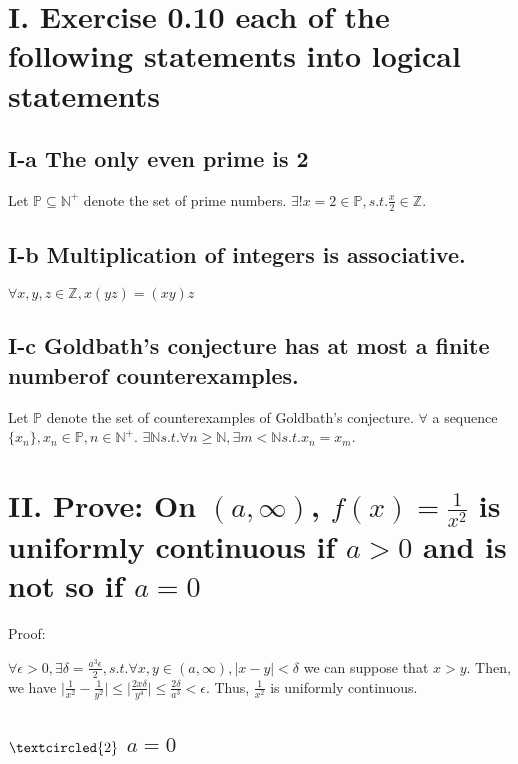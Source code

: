 \documentclass[twoside,a4paper]{article}
\begin{document}
\pagestyle{fancy}
\fancyhead{}


\section*{I. Exercise 0.10 \small{each of the following statements into logical statements}}

\subsection*{I-a \small{The only even prime is 2}}

Let $\mathbb{P} \subseteq \mathbb{N}^+$ denote the set of prime numbers. 
$\exists! x = 2 \in \mathbb{P}, s.t. \frac{x}{2} \in \mathbb{Z}.$ 

\subsection*{I-b \small{Multiplication of integers is associative.}}
$\forall x,y,z \in \mathbb{Z}, x(yz)=(xy)z$

\subsection*{I-c \small{Goldbath's conjecture has at most a finite numberof counterexamples.}}

Let $\mathbb{P}$ denote the set of counterexamples of Goldbath's conjecture.
$\forall$ a sequence $\{ x_{n} \}, x_{n} \in \mathbb{P}, n \in \mathbb{N}^+$.
$\exists \mathbb{N} s.t. \forall n \geq \mathbb{N}, 
\exists m < \mathbb{N} s.t. x_{n} = x_{m}$.  

\section*{II. \small{Prove: On $(a, \infty)$, $f(x)=\frac{1}{x^2}$ is uniformly continuous if $a>0$ and is not so if $a=0$  } }
Proof:

$\forall \epsilon > 0, \exists \delta = \frac{a^{3}\epsilon}{2},
s.t. \forall x, y \in (a, \infty), \mid x - y \mid < \delta$
we can suppose that $x > y$.
Then, we have $\mid\frac{1}{x^2} - \frac{1}{y^2}\mid \leq \mid\frac{2x\delta}
{y^4}\mid \leq \frac{2\delta}{a^3} < \epsilon$.
Thus, $\frac{1}{x^2}$ is uniformly continuous.

\subsection*{\small{$\textcircled{2}$ $a=0$}}
\end{document}
